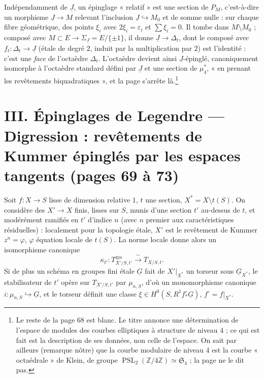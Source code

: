 \documentclass[11pt,a4paper]{article}
\begin{document}
Indépendamment de $\underline{J}$, un épinglage « relatif » est une section de
$P_M$, c'est-à-dire un morphisme $\underline{J} \to M$ relevant l'inclusion
$\underline{J} \hookrightarrow M_0$ et de somme nulle : sur chaque fibre
géométrique, des points $\xi_i$ avec $2\xi_i = \varepsilon_i$ et $\sum \xi_i =
0$. Il tombe dans $M \setminus M_0$ ; composé avec $M \subset E \to
\Sigma_{\underline{J}} = E/\{\pm 1\}$, il donne $\underline{J} \to \Delta_t$,
dont le composé avec $f_t : \Delta_t \to \underline{J}$ (étale de degré $2$,
induit par la multiplication par $2$) est l'identité : c'est une \emph{face} de
l'octaèdre $\Delta_t$. L'octaèdre devient ainsi $\underline{J}$-épinglé,
canoniquement isomorphe à l'octaèdre standard défini par $\underline{J}$ et une
section de $\mu_4^{*}$, « en prenant les revêtements biquadratiques », et la
page s'arrête là.\footnote{Le reste de la page 68 est blanc. Le titre annonce une
détermination de l'espace de modules des courbes elliptiques à structure de
niveau $4$ ; ce qui est fait est la description de ses données, non celle de
l'espace. On sait par ailleurs (remarque nôtre) que la courbe modulaire de
niveau $4$ est la courbe « octaédrale » de Klein, de groupe
$\operatorname{PSL}_2(\mathbb{Z}/4\mathbb{Z}) \simeq \mathfrak{S}_4$ ; la page ne
le dit pas.}

\section*{III. Épinglages de Legendre --- Digression : revêtements de Kummer épinglés par les espaces tangents (pages 69 à 73)}

Soit $f : X \to S$ lisse de dimension relative $1$, $t$ une section, $X^{*} = X
\setminus t(S)$. On considère des $X' \to X$ finis, lisses sur $S$, munis d'une
section $t'$ au-dessus de $t$, et modérément ramifiés en $t'$ d'indice $n$ (avec
$n$ premier aux caractéristiques résiduelles) : localement pour la topologie
étale, $X'$ est le revêtement de Kummer $z^n = \varphi$, $\varphi$ équation
locale de $t(S)$. La norme locale donne alors un isomorphisme canonique
\[
\kappa_{t'} : T_{X'/S, t'}^{\otimes n} \xrightarrow{\;\sim\;} T_{X/S, t} .
\]
Si de plus un schéma en groupes fini étale $\underline{G}$ fait de $X'|_{X^{*}}$
un torseur sous $\underline{G}_{X^{*}}$, le stabilisateur de $t'$ opère sur
$T_{X'/S, t'}$ par $\mu_{n,S}$, d'où un monomorphisme canonique $i : \mu_{n,S}
\hookrightarrow \underline{G}$, et le torseur définit une classe $\xi \in
H^0(S, R^1 f^{\circ}_{*} \underline{G})$, $f^{\circ} = f|_{X^{*}}$.
\end{document}

